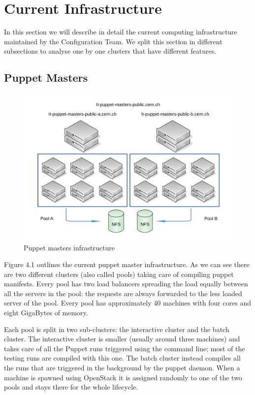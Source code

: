 \section{Current Infrastructure}

In this section we will describe in detail the current computing
infrastructure maintained by the Configuration Team. We split this section
in different subsections to analyse one by one clusters that have
different features.

\subsection{Puppet Masters}

\begin{figure}[H]
\includegraphics[width=\textwidth,height=\textheight,keepaspectratio]{ConfigurationManagement/Infrastructure_pm.jpg}
\caption{Puppet masters infrastructure}
\end{figure}

Figure 4.1 outlines the current puppet master infrastructure. As we can
see there are two different clusters (also called pools) taking care of
compiling puppet manifests. Every pool has two load balancers spreading
the load equally between all the servers in the pool: the requests are
always forwarded to the less loaded server of the pool. Every pool has
approximately 40 machines with four cores and eight GigaBytes of memory.

Each pool is split in two sub-clusters: the interactive cluster and the
batch cluster. The interactive cluster is smaller (usually around three
machines) and takes care of all the Puppet runs triggered using the
command line; most of the testing runs are compiled with this one. The
batch cluster instead compiles all the runs that are triggered in the
background by the puppet daemon. When a machine is spawned using OpenStack
it is assigned randomly to one of the two pools and stays there for the
whole lifecycle.


